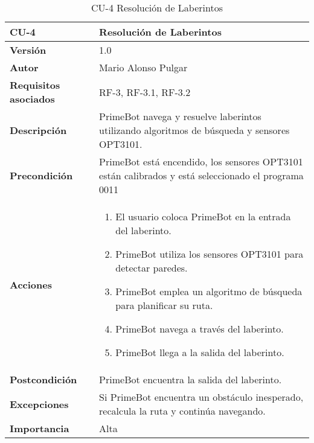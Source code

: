 \begin{table}[p]
	\centering
	\begin{tabularx}{\linewidth}{ p{} p{} }
		\toprule
		\textbf{CU-4}    & \textbf{Resolución de Laberintos}\\
		\toprule
		\textbf{Versión}              & 1.0    \\
		\textbf{Autor}                & Mario Alonso Pulgar \\
		\textbf{Requisitos asociados} & RF-3, RF-3.1, RF-3.2 \\
		\textbf{Descripción}          & PrimeBot navega y resuelve laberintos utilizando algoritmos de búsqueda y sensores OPT3101. \\
		\textbf{Precondición}         & PrimeBot está encendido, los sensores OPT3101 están calibrados y está seleccionado el programa 0011\\
		\textbf{Acciones}             &
		\begin{enumerate}
			\def\labelenumi{\arabic{enumi}.}
			\tightlist
				\item El usuario coloca PrimeBot en la entrada del laberinto.
				\item PrimeBot utiliza los sensores OPT3101 para detectar paredes.
				\item PrimeBot emplea un algoritmo de búsqueda para planificar su ruta.
				\item PrimeBot navega a través del laberinto.
				\item PrimeBot llega a la salida del laberinto.
		\end{enumerate}\\
		\textbf{Postcondición}        & PrimeBot encuentra la salida del laberinto.\\
		\textbf{Excepciones}          & Si PrimeBot encuentra un obstáculo inesperado, recalcula la ruta y continúa navegando. \\
		\textbf{Importancia}          & Alta \\
		\bottomrule
	\end{tabularx}
	\caption{CU-4 Resolución de Laberintos}
\end{table}

